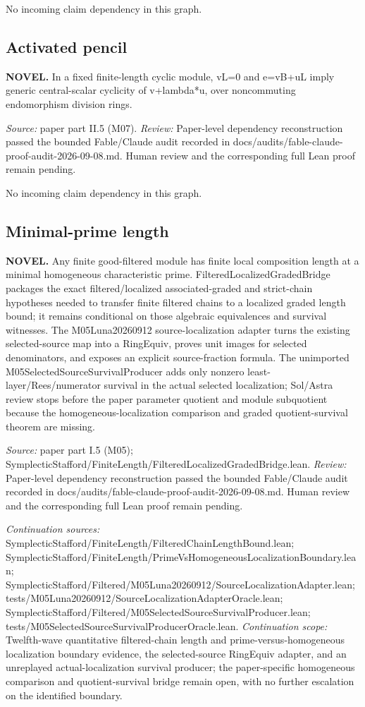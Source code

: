 No incoming claim dependency in this graph.
\subsection{Activated pencil}\hypertarget{claim:pencil}{}\backmap
\textbf{NOVEL.} In a fixed finite-length cyclic module, vL=0 and e=vB+uL imply generic central-scalar cyclicity of v+lambda*u, over noncommuting endomorphism division rings.

\emph{Source:} paper part II.5 (M07).
\emph{Review:} Paper-level dependency reconstruction passed the bounded Fable/Claude audit recorded in docs/audits/fable-claude-proof-audit-2026-09-08.md. Human review and the corresponding full Lean proof remain pending.

No incoming claim dependency in this graph.
\subsection{Minimal-prime length}\hypertarget{claim:length}{}\backmap
\textbf{NOVEL.} Any finite good-filtered module has finite local composition length at a minimal homogeneous characteristic prime. FilteredLocalizedGradedBridge packages the exact filtered/localized associated-graded and strict-chain hypotheses needed to transfer finite filtered chains to a localized graded length bound; it remains conditional on those algebraic equivalences and survival witnesses. The M05Luna20260912 source-localization adapter turns the existing selected-source map into a RingEquiv, proves unit images for selected denominators, and exposes an explicit source-fraction formula. The unimported M05SelectedSourceSurvivalProducer adds only nonzero least-layer/Rees/numerator survival in the actual selected localization; Sol/Astra review stops before the paper parameter quotient and module subquotient because the homogeneous-localization comparison and graded quotient-survival theorem are missing.

\emph{Source:} paper part I.5 (M05); SymplecticStafford/FiniteLength/FilteredLocalizedGradedBridge.lean.
\emph{Review:} Paper-level dependency reconstruction passed the bounded Fable/Claude audit recorded in docs/audits/fable-claude-proof-audit-2026-09-08.md. Human review and the corresponding full Lean proof remain pending.

\emph{Continuation sources:} SymplecticStafford/FiniteLength/FilteredChainLengthBound.lean; SymplecticStafford/FiniteLength/PrimeVsHomogeneousLocalizationBoundary.lean; SymplecticStafford/Filtered/M05Luna20260912/SourceLocalizationAdapter.lean; tests/M05Luna20260912/SourceLocalizationAdapterOracle.lean; SymplecticStafford/Filtered/M05SelectedSourceSurvivalProducer.lean; tests/M05SelectedSourceSurvivalProducerOracle.lean.
\emph{Continuation scope:} Twelfth-wave quantitative filtered-chain length and prime-versus-homogeneous localization boundary evidence, the selected-source RingEquiv adapter, and an unreplayed actual-localization survival producer; the paper-specific homogeneous comparison and quotient-survival bridge remain open, with no further escalation on the identified boundary.

